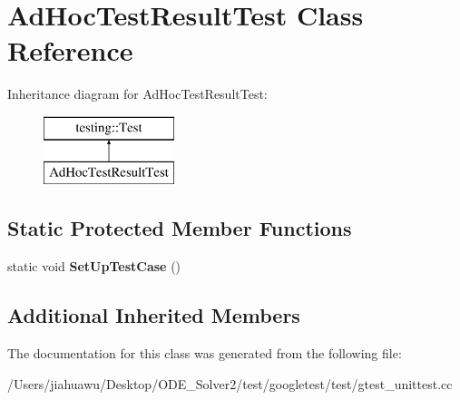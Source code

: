 \hypertarget{class_ad_hoc_test_result_test}{}\section{Ad\+Hoc\+Test\+Result\+Test Class Reference}
\label{class_ad_hoc_test_result_test}
Inheritance diagram for Ad\+Hoc\+Test\+Result\+Test\+:\begin{figure}[H]
\begin{center}
\leavevmode
\includegraphics[height=2.000000cm]{class_ad_hoc_test_result_test}
\end{center}
\end{figure}
\subsection*{Static Protected Member Functions}
\begin{DoxyCompactItemize}
\item 
\mbox{\label{class_ad_hoc_test_result_test_a0955d04d3dd7994561930c83489914a3}} 
static void {\bfseries Set\+Up\+Test\+Case} ()
\end{DoxyCompactItemize}
\subsection*{Additional Inherited Members}


The documentation for this class was generated from the following file\+:\begin{DoxyCompactItemize}
\item 
/\+Users/jiahuawu/\+Desktop/\+O\+D\+E\+\_\+\+Solver2/test/googletest/test/gtest\+\_\+unittest.\+cc\end{DoxyCompactItemize}
